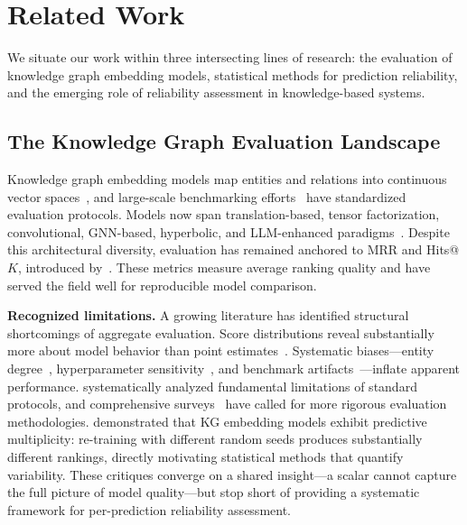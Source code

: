 \section{Related Work}
\label{sec:related}

We situate our work within three intersecting lines of research: the evaluation of knowledge graph embedding models, statistical methods for prediction reliability, and the emerging role of reliability assessment in knowledge-based systems.

\subsection{The Knowledge Graph Evaluation Landscape}

Knowledge graph embedding models map entities and relations into continuous vector spaces~\cite{wang2017knowledge}, and large-scale benchmarking efforts~\cite{ali2021pykeen,rossi2021knowledge} have standardized evaluation protocols.
Models now span translation-based, tensor factorization, convolutional, GNN-based, hyperbolic, and LLM-enhanced paradigms~\cite{bordes2013translating,sun2019rotate,trouillon2016complex,dettmers2018convolutional,balazevic2019tucker,vashishth2020composition,zhu2021neural,le2023knowledge,lu2024deep,fang2025knowledge,gao2025unifying}.
Despite this architectural diversity, evaluation has remained anchored to MRR and Hits@$K$, introduced by~\cite{bordes2013translating}.
These metrics measure average ranking quality and have served the field well for reproducible model comparison.

\textbf{Recognized limitations.}
A growing literature has identified structural shortcomings of aggregate evaluation.
Score distributions reveal substantially more about model behavior than point estimates~\cite{reimers2017reporting}.
Systematic biases---entity degree~\cite{shomer2023toward}, hyperparameter sensitivity~\cite{lloyd2023assessing}, and benchmark artifacts~\cite{safavi2020evaluating,wang2023evaluation}---inflate apparent performance.
\cite{liu2022understanding} systematically analyzed fundamental limitations of standard protocols, and comprehensive surveys~\cite{shen2022comprehensive,li2023knowledge,jarnac2025uncertainty} have called for more rigorous evaluation methodologies.
\cite{zhu2024predictive} demonstrated that KG embedding models exhibit predictive multiplicity: re-training with different random seeds produces substantially different rankings, directly motivating statistical methods that quantify variability.
These critiques converge on a shared insight---a scalar cannot capture the full picture of model quality---but stop short of providing a systematic framework for per-prediction reliability assessment.

